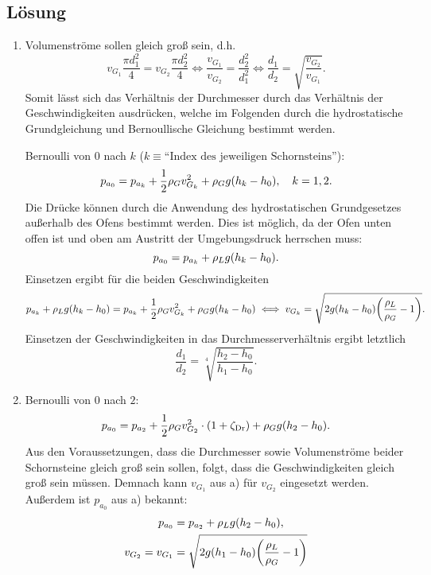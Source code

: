 \documentclass{exercise}
\begin{document}
    \subsection*{Lösung}
    \begin{enumerate}
        \item Volumenströme sollen gleich groß sein, d.h.
        \[
            v_{G_1}\frac{\pi d_1^2}{4} = v_{G_2}\frac{\pi d_2^2}{4} \iff \frac{v_{G_1}}{v_{G_2}} = \frac{d_2^2}{d_1^2} \iff \frac{d_1}{d_2} = \sqrt{\frac{v_{G_2}}{v_{G_1}}}.
        \]
        Somit lässt sich das Verhältnis der Durchmesser durch das Verhältnis der Geschwindigkeiten ausdrücken, welche im Folgenden durch die hydrostatische Grundgleichung und Bernoullische Gleichung bestimmt werden.
        
        Bernoulli von \(0\) nach \(k\) (\(k \equiv \text{``Index des jeweiligen Schornsteins''}\)):
        \[
            p_{a_0} = p_{a_k} + \frac{1}{2}\rho_G v_{G_k}^2 + \rho_G g\parentheses*{h_k - h_0}, \quad k = 1, 2.
        \]
        Die Drücke können durch die Anwendung des hydrostatischen Grundgesetzes außerhalb des Ofens bestimmt werden.
        Dies ist möglich, da der Ofen unten offen ist und oben am Austritt der Umgebungsdruck herrschen muss:
        \[
            p_{a_0} = p_{a_k} + \rho_L g\parentheses*{h_k - h_0}.
        \]
        Einsetzen ergibt für die beiden Geschwindigkeiten
        \[
            p_{a_k} + \rho_L g\parentheses*{h_k - h_0} = p_{a_k} + \frac{1}{2}\rho_G v_{G_k}^2 + \rho_G g\parentheses*{h_k - h_0} \iff v_{G_k} = \sqrt{2g\parentheses*{h_k - h_0}\parentheses*{\frac{\rho_L}{\rho_G} - 1}}.
        \]
        Einsetzen der Geschwindigkeiten in das Durchmesserverhältnis ergibt letztlich
        \[
            \frac{d_1}{d_2} = \sqrt[4]{\frac{h_2 - h_0}{h_1 - h_0}}.
        \]
        \item Bernoulli von \(0\) nach \(2\):
        \[
            p_{a_0} = p_{a_2} + \frac{1}{2}\rho_G v_{G_2}^2 \cdot \parentheses*{1 + \zeta_{\text{Dr}}} + \rho_G g\parentheses*{h_2 - h_0}.
        \]
        Aus den Voraussetzungen, dass die Durchmesser sowie Volumenströme beider Schornsteine gleich groß sein sollen, folgt, dass die Geschwindigkeiten gleich groß sein müssen.
        Demnach kann \(v_{G_1}\) aus a) für \(v_{G_2}\) eingesetzt werden.
        Außerdem ist \(p_{a_0}\) aus a) bekannt:
        \begin{align*}
            p_{a_0} &= p_{a_2} + \rho_L g\parentheses*{h_2 - h_0},\\
            v_{G_2} = v_{G_1} &= \sqrt{2g\parentheses*{h_1 - h_0}\parentheses*{\frac{\rho_L}{\rho_G} - 1}}

\end{align*}
\end{enumerate}
\end{document}
